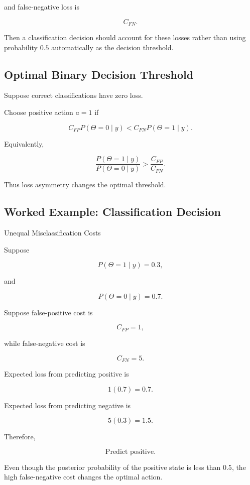 and false-negative loss is

\[
C_{FN}.
\]

Then a classification decision should account for these losses rather than
using probability \(0.5\) automatically as the decision threshold.

\subsection{Optimal Binary Decision Threshold}
\label{subsec:optimal-binary-threshold}

Suppose correct classifications have zero loss.

Choose positive action \(a=1\) if

\[
C_{FP}
P(\Theta=0\mid y)
<
C_{FN}
P(\Theta=1\mid y).
\]

Equivalently,

\[
\boxed{
\frac{
P(\Theta=1\mid y)
}{
P(\Theta=0\mid y)
}
>
\frac{
C_{FP}
}{
C_{FN}
}.
}
\]

Thus loss asymmetry changes the optimal threshold.

\subsection{Worked Example: Classification Decision}
\label{subsec:worked-classification-decision}

\begin{workedexamplebox}{Unequal Misclassification Costs}

Suppose

\[
P(\Theta=1\mid y)=0.3,
\]

and

\[
P(\Theta=0\mid y)=0.7.
\]

Suppose false-positive cost is

\[
C_{FP}=1,
\]

while false-negative cost is

\[
C_{FN}=5.
\]

Expected loss from predicting positive is

\[
1(0.7)
=
0.7.
\]

Expected loss from predicting negative is

\[
5(0.3)
=
1.5.
\]

Therefore,

\begin{answerbox}
\[
\boxed{
\text{Predict positive}.
}
\]
\end{answerbox}

Even though the posterior probability of the positive state is less than
\(0.5\), the high false-negative cost changes the optimal action.

\end{workedexamplebox}

